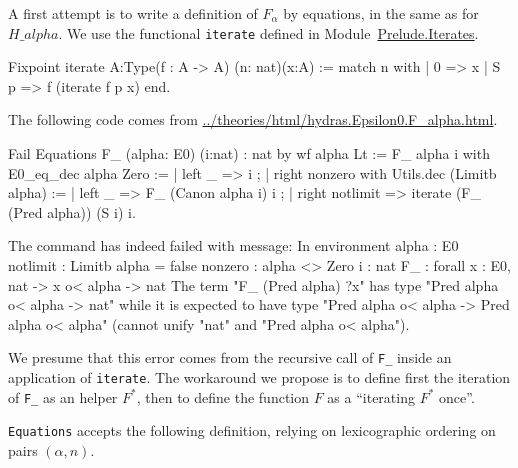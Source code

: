 A first attempt is to write a definition of $F_\alpha$ by equations, in the same as for $H\_alpha$.  We use the functional \texttt{iterate} defined in 
Module~\href{../theories/html/hydras.Prelude.Iterates.html\#iterate}{Prelude.Iterates}.

\begin{Coqsrc}
Fixpoint iterate {A:Type}(f : A -> A) (n: nat)(x:A) :=
  match n with
  | 0 => x
  | S p => f (iterate  f p x)
  end.
\end{Coqsrc}

The following code comes from 
 \url{../theories/html/hydras.Epsilon0.F_alpha.html}.



\begin{Coqsrc}
Fail Equations F_ (alpha: E0) (i:nat) :  nat  by wf  alpha Lt :=
  F_ alpha  i with E0_eq_dec alpha Zero :=
    { | left _ =>  i ;
      | right nonzero
          with Utils.dec (Limitb alpha) :=
          { | left _ =>  F_ (Canon alpha i)  i ;
            | right notlimit =>  iterate (F_ (Pred alpha))  (S i) i}}.
\end{Coqsrc}

\begin{Coqanswer}
The command has indeed failed with message:
In environment
alpha : E0
notlimit : Limitb alpha = false
nonzero : alpha <> Zero
i : nat
F_ : forall x : E0, nat -> x o< alpha -> nat
The term "F_ (Pred alpha) ?x" has type "Pred alpha o< alpha -> nat"
while it is expected to have type "Pred alpha o< alpha -> Pred alpha o< alpha"
(cannot unify "nat" and "Pred alpha o< alpha").
\end{Coqanswer}


We presume that this error comes from the recursive call of \texttt{F\_} inside
an application of \texttt{iterate}. The workaround we propose is to define first 
the iteration of \texttt{F\_}  as an helper $F^*$, then to define the function $F$ as a ``iterating $F^*$ once''.

\texttt{Equations} accepts the following definition, relying on  lexicographic ordering on pairs $(\alpha,n)$.


\label{sect:F-equations}

\label{Functions:F-alpha}
  
